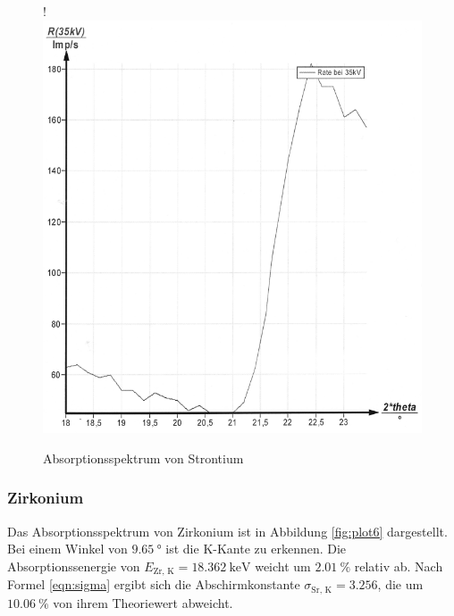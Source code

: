 \begin{figure}[H]!
  \centering
  \includegraphics[scale=0.3]{content/bild5.png}
  \caption{Absorptionsspektrum von Strontium}
  \label{fig:plot5}
\end{figure}

\subsubsection{Zirkonium}

Das Absorptionsspektrum von Zirkonium ist in Abbildung \ref{fig:plot6} dargestellt.
Bei einem Winkel von $\SI{9,65}{\degree}$ ist die K-Kante zu erkennen. Die
Absorptionssenergie von $E_\text{Zr, K} = \SI{18.362}{\kilo\eV}$ weicht
um $\SI{2.01}{\percent}$ relativ ab. Nach Formel \eqref{eqn:sigma} ergibt 
sich die Abschirmkonstante $\sigma_\text{Sr, K} = 3.256$, die um 
$\SI{10.06}{\percent}$ von ihrem Theoriewert abweicht.

